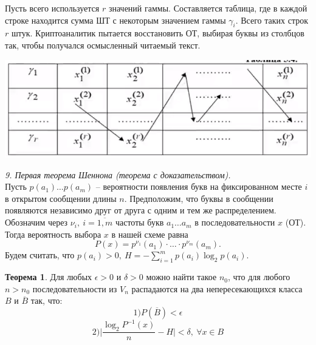 Пусть всего используется $r$ значений гаммы. Составляется таблица, где в каждой строке находится сумма ШТ с некоторым значением гаммы $\gamma_i$. Всего таких строк $r$ штук. Криптоаналитик пытается восстановить ОТ, выбирая буквы из столбцов так, чтобы получался осмысленный читаемый текст.

\includegraphics[scale=.5]{eka/img/zig_zag.png}

\noindent \textit{9. Первая теорема Шеннона (теорема с доказательством).} \\

Пусть $p(a_1) \ldots p(a_m)$ -- вероятности появления букв на фиксированном месте $i$ в открытом сообщении длины $n$. Предположим, что буквы в сообщении появляются независимо друг от друга с одним и тем же распределением. Обозначим через $\nu_i,\ i = \overline{1, m}$ частоты букв $a_1 \ldots a_m$ в последовательности $x$ (ОТ). Тогда вероятность выбора $x$ в нашей схеме равна
$$P(x) = p^{\nu_1}(a_1) \cdot \ldots \cdot p^{\nu_m}(a_m).$$
Будем считать, что $p(a_i) > 0,\ H = - \sum_{i=1}^m p(a_i) \log_2{p(a_i)}$.

\textbf{Теорема 1}. Для любых $\epsilon > 0 $ и $\delta > 0$ можно найти такое $n_0$, что для любого $n > n_0$ последовательности из $V_n$ распадаются на два непересекающихся класса $B$ и $\overline{B}$ так, что:
$$1) P(\overline{B}) < \epsilon$$
$$2) \Big |\frac{\log_2{P^{-1}(x)}}{n} - H \Big | < \delta,\ \forall x \in B$$

